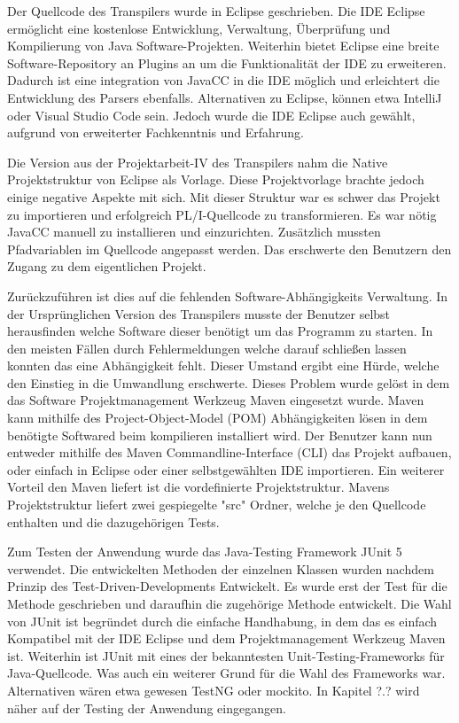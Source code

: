 Der Quellcode des Transpilers wurde in Eclipse geschrieben. Die IDE Eclipse ermöglicht eine kostenlose Entwicklung, Verwaltung, Überprüfung und Kompilierung von Java Software-Projekten. Weiterhin bietet Eclipse eine breite Software-Repository an Plugins an um die Funktionalität der IDE zu erweiteren. Dadurch ist eine integration von JavaCC in die IDE möglich und erleichtert die Entwicklung des Parsers ebenfalls. 
Alternativen zu Eclipse, können etwa IntelliJ oder Visual Studio Code sein. Jedoch wurde die IDE Eclipse auch gewählt, aufgrund von erweiterter Fachkenntnis und Erfahrung.

Die Version aus der Projektarbeit-IV des Transpilers nahm die Native Projektstruktur von Eclipse als Vorlage. Diese Projektvorlage brachte jedoch einige negative Aspekte mit sich. Mit dieser Struktur war es schwer das Projekt zu importieren und erfolgreich PL/I-Quellcode zu transformieren. Es war nötig JavaCC manuell zu installieren und einzurichten. Zusätzlich mussten Pfadvariablen im Quellcode angepasst werden. Das erschwerte den Benutzern den Zugang zu dem eigentlichen Projekt.

Zurückzuführen ist dies auf die fehlenden Software-Abhängigkeits Verwaltung. In der Ursprünglichen Version des Transpilers musste der Benutzer selbst herausfinden welche Software dieser benötigt um das Programm zu starten. In den meisten Fällen durch Fehlermeldungen welche darauf schließen lassen konnten das eine Abhängigkeit fehlt. Dieser Umstand ergibt eine Hürde, welche den Einstieg in die Umwandlung erschwerte. 
Dieses Problem wurde gelöst in dem das Software Projektmanagement Werkzeug Maven eingesetzt wurde. Maven kann mithilfe des Project-Object-Model (POM) Abhängigkeiten lösen in dem benötigte Softwared beim kompilieren installiert wird. Der Benutzer kann nun entweder mithilfe des Maven Commandline-Interface (CLI) das Projekt aufbauen, oder einfach in Eclipse oder einer selbstgewählten IDE importieren.
Ein weiterer Vorteil den Maven liefert ist die vordefinierte Projektstruktur. Mavens Projektstruktur liefert zwei gespiegelte "src" Ordner, welche je den Quellcode enthalten und die dazugehörigen Tests.

Zum Testen der Anwendung wurde das Java-Testing Framework JUnit 5 verwendet. Die entwickelten Methoden der einzelnen Klassen wurden nachdem Prinzip
des Test-Driven-Developments Entwickelt. Es wurde erst der Test für die Methode geschrieben und daraufhin die zugehörige Methode entwickelt. Die Wahl von JUnit ist begründet durch die einfache Handhabung, in dem das es einfach Kompatibel mit der IDE Eclipse und dem Projektmanagement Werkzeug Maven ist. Weiterhin ist JUnit mit eines der bekanntesten Unit-Testing-Frameworks für Java-Quellcode. Was auch ein weiterer Grund für die Wahl des Frameworks war. Alternativen wären etwa gewesen TestNG oder mockito.
In Kapitel ?.? wird näher auf der Testing der Anwendung eingegangen. 

